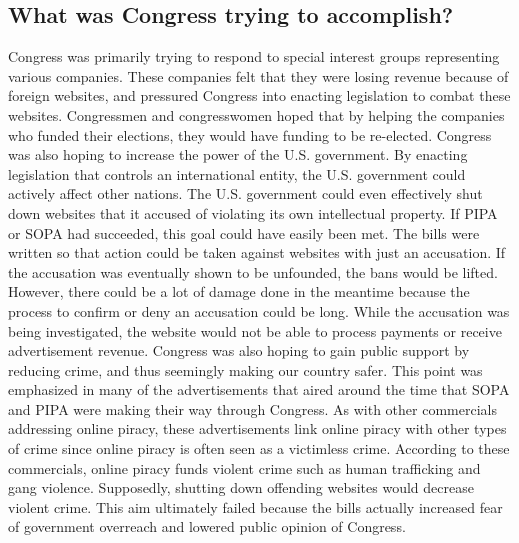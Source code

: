 \documentclass[11pt,journal,compsoc]{IEEEtran}
\begin{document}
\subsection{What was Congress trying to accomplish?}
Congress was primarily trying to respond to special interest groups representing various companies. These companies felt that they were losing revenue because of foreign websites, and pressured Congress into enacting legislation to combat these websites. Congressmen and congresswomen hoped that by helping the companies who funded their elections, they would have funding to be re-elected. 
\indent Congress was also hoping to increase the power of the U.S. government. By enacting legislation that controls an international entity, the U.S. government could actively affect other nations. The U.S. government could even effectively shut down websites that it accused of violating its own intellectual property. If PIPA or SOPA had succeeded, this goal could have easily been met. The bills were written so that action could be taken against websites with just an accusation. If the accusation was eventually shown to be unfounded, the bans would be lifted. However, there could be a lot of damage done in the meantime because the process to confirm or deny an accusation could be long. While the accusation was being investigated, the website would not be able to process payments or receive advertisement revenue. 
\indent Congress was also hoping to gain public support by reducing crime, and thus seemingly making our country safer. This point was emphasized in many of the advertisements that aired around the time that SOPA and PIPA were making their way through Congress. As with other commercials addressing online piracy, these advertisements link online piracy with other types of crime since online piracy is often seen as a victimless crime. According to these commercials, online piracy funds violent crime such as human trafficking and gang violence. Supposedly, shutting down offending websites would decrease violent crime. This aim ultimately failed because the bills actually increased fear of government overreach and lowered public opinion of Congress. 
\end{document}
